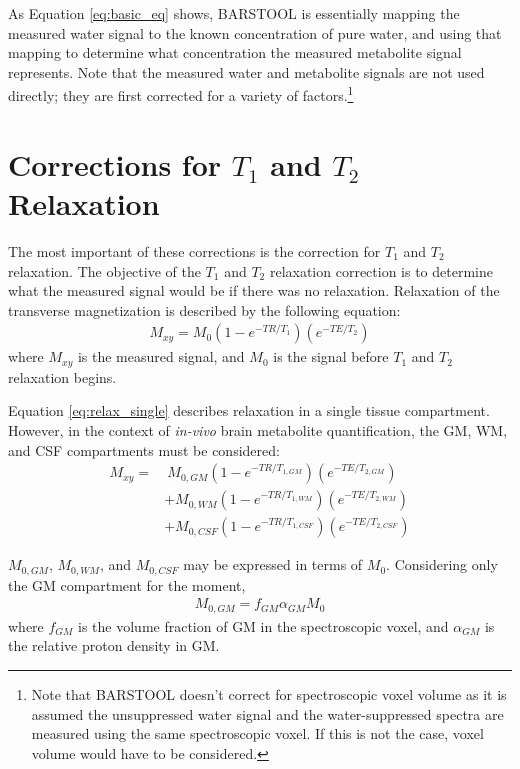 \documentclass{article}
\begin{document}
As Equation \eqref{eq:basic_eq} shows, BARSTOOL is essentially mapping the measured water signal to the known concentration of pure water, and using that mapping to determine what concentration the measured metabolite signal represents. Note that the measured water and metabolite signals are not used directly; they are first corrected for a variety of factors.\footnote{Note that BARSTOOL doesn't correct for spectroscopic voxel volume as it is assumed the unsuppressed water signal and the water-suppressed spectra are measured using the same spectroscopic voxel. If this is not the case, voxel volume would have to be considered.}

\section{Corrections for $T_1$ and $T_2$ Relaxation}
The most important of these corrections is the correction for $T_1$ and $T_2$ relaxation. The objective of the $T_1$ and $T_2$ relaxation correction is to determine what the measured signal would be if there was no relaxation. Relaxation of the transverse magnetization is described by the following equation:
\begin{align}
	M_{xy} = M_0 \left(1-e^{-TR/T_1}\right)\left(e^{-TE/T_2}\right)
	\label{eq:relax_single}
\end{align}
where $M_{xy}$ is the measured signal, and $M_0$ is the signal before $T_1$ and $T_2$ relaxation begins.

Equation \eqref{eq:relax_single} describes relaxation in a single tissue compartment. However, in the context of \textit{in-vivo} brain metabolite quantification, the GM, WM, and CSF compartments must be considered:
\begin{align}
	\label{eq:relax_multi_1}
	M_{xy} =	 & ~ M_{0,GM} \left(1-e^{-TR/T_{1, GM}}\right)\left(e^{-TE/T_{2, GM}}\right) \nonumber \\
			 & + M_{0,WM} \left(1-e^{-TR/T_{1, WM}}\right)\left(e^{-TE/T_{2, WM}}\right) \\
			 & + M_{0,CSF} \left(1-e^{-TR/T_{1, CSF}}\right)\left(e^{-TE/T_{2, CSF}}\right) \nonumber
\end{align}

$M_{0,GM}$, $M_{0,WM}$, and $M_{0,CSF}$ may be expressed in terms of $M_0$. Considering only the GM compartment for the moment, 
\begin{align*}
	M_{0,GM} = f_{GM} \alpha_{GM} M_0
\end{align*}
where $f_{GM}$ is the volume fraction of GM in the spectroscopic voxel, and $\alpha_{GM}$ is the relative proton density in GM.
\end{document}
